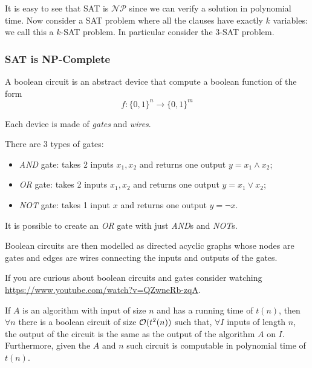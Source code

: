 \documentclass[12pt]{extarticle}
\newcommand{\NP}{{\mathcal{NP}}}
\begin{document}
It is easy to see that SAT is $\NP$ since we can verify a solution in polynomial time.
Now consider a SAT problem where all the clauses have exactly $k$ variables: we call this a $k$-SAT problem.
In particular consider the 3-SAT problem.

\subsubsection{SAT is NP-Complete}

\begin{definition}
    A boolean circuit is an abstract device that compute a boolean function of the form
    \begin{equation}
        f: \{0, 1\}^n \to \{0, 1\}^m
    \end{equation}

    Each device is made of \emph{gates} and \emph{wires}.
\end{definition}

\begin{definition}[gate]
    There are 3 types of gates:
    \begin{itemize}
        \item \emph{AND} gate: takes 2 inputs $x_1, x_2$ and returns one output $y = x_1 \land x_2$;
        \item \emph{OR} gate: takes 2 inputs $x_1, x_2$ and returns one output $y = x_1 \lor x_2$;
        \item \emph{NOT} gate: takes 1 input $x$ and returns one output $y = \lnot x$.
    \end{itemize}
\end{definition}
\begin{remark}
    It is possible to create an \emph{OR} gate with just \emph{AND}s and \emph{NOT}s.
\end{remark}

Boolean circuits are then modelled as directed acyclic graphs whose nodes are gates and edges are wires connecting the inputs and outputs of the gates.

If you are curious about boolean circuits and gates consider watching \url{https://www.youtube.com/watch?v=QZwneRb-zqA}.

\begin{theorem}
    If $A$ is an algorithm with input of size $n$ and has a running time of $t(n)$, then  $\forall n$ there is a boolean circuit of size $\mathcal{O}(t^2(n))$ such that, $\forall I$ inputs of length $n$, the output of the circuit is the same as the output of the algorithm $A$ on $I$.
    Furthermore, given the $A$ and $n$ such circuit is computable in polynomial time of $t(n)$.
\end{theorem}
\end{document}
